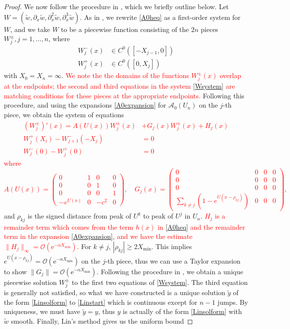 \documentclass[review,onefignum,onetabnum]{siamart171218}
\newcommand{\rme}{\mathrm{e}}
\newcommand{\calA}{\mathcal{A}}
\newcommand{\revised}[1]{ \textcolor{red}{#1} }
\begin{document}
\begin{proof}
We now follow the procedure in \cite{sandstede:som98}, which we briefly outline below. Let $W = (\tilde{w}, \partial_x\tilde{w},\partial_x^2 \tilde{w},\partial_x^3 \tilde{w})$. As in \cite{sandstede:som98}, we rewrite \cref{A0heq} as a first-order system for $W$, and we take $W$ to be a piecewise function consisting of the $2n$ pieces $W_j^\pm, j = 1, \dots, n$, where
\begin{align*}
W_j^-(x) &\in C^0([-X_{j-1}, 0]) \\
W_j^+(x) &\in C^0([0, X_j])
\end{align*}
with $X_0 = X_n = \infty$.
\revised{
We note the the domains of the functions $W_j^\pm(x)$ overlap at the endpoints; the second and third equations in the system \cref{Wsystem} are matching conditions for these pieces at the appropriate endpoints.
}
Following this procedure, and using the expansions \cref{A0expansion} for $\calA_0(U_n)$ on the $j$-th piece, we obtain the system of equations
\revised{
\begin{equation}\label{Wsystem}
\begin{aligned}
(W_j^\pm)'(x) = A(U(x)) W_j^\pm(x) &+ G_j(x) W_j^\pm(x)+ H_j(x) \\
W_j^+(X_i) - W_{j+1}^-(-X_j) &= 0  \\
W_j^-(0) - W_j^+(0) &= 0
\end{aligned}
\end{equation}
where
\[
A(U(x)) = \begin{pmatrix}
0 & 1 & 0 & 0 \\
0 & 0 & 1 & 0 \\
0 & 0 & 0 & 1 \\
-e^{U(x)} & 0 & -c^2 & 0
\end{pmatrix}, \quad
G_j(x) = \begin{pmatrix}
0 & 0 & 0 & 0 \\
0 & 0 & 0 & 0 \\
0 & 0 & 0 & 0 \\
\sum_{k \neq j} (1 - e^{U(x - \rho_{kj})}) & 0 & 0 & 0
\end{pmatrix},
\]
}
and $\rho_{kj}$ is the signed distance from peak of $U^k$ to peak of $U^j$ in $U_n$.
\revised{
$H_j$ is a remainder term which comes from the term $h(x)$ in \cref{A0heq} and the remainder term in the expansion \cref{A0expansion}, and we have the estimate $\|H_j \|_\infty = \mathcal{O}(\rme^{-\alpha X_{\mathrm{min}}})$.
}
For $k \neq j$, $|\rho_{kj}| \geq 2 X_{\mathrm{min}}$. This implies $e^{U(x - \rho_{kj})} = \mathcal{O}(\rme^{-\alpha X_{\mathrm{min}}})$ on the $j$-th piece, thus we can use a Taylor expansion to show $\|G_j\| = \mathcal{O}(\rme^{-\alpha X_{\mathrm{min}}})$. Following the procedure in \cite{sandstede:som98}, we obtain a unique piecewise solution $W_j^\pm$ to the first two equations of \cref{Wsystem}. The third equation is generally not satisfied, so what we have constructed is a unique solution $\tilde{y}$ of the form \cref{Linsolform} to \cref{Linstart} which is continuous except for $n - 1$ jumps. By uniqueness, we must have $\tilde{y} = y$, thus $y$ is actually of the form \cref{Linsolform} with $\tilde{w}$ smooth. Finally, Lin's method gives us the uniform bound

\end{proof}
\end{document}
